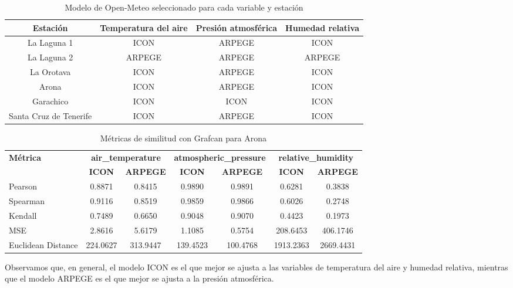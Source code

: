 \begin{table}[htb]
    \centering
    \begin{tabular}{|c|c|c|c|}
        \hline
        Estación & Temperatura del aire & Presión atmosférica & Humedad relativa \\
        \hline
        La Laguna 1 & ICON & ARPEGE & ICON \\
        La Laguna 2 & ARPEGE & ARPEGE & ARPEGE \\
        La Orotava & ICON & ARPEGE & ICON \\
        Arona & ICON & ARPEGE & ICON \\
        Garachico & ICON & ICON & ICON \\
        Santa Cruz de Tenerife & ICON & ARPEGE & ICON \\
        \hline
    \end{tabular}
    \caption{Modelo de Open-Meteo seleccionado para cada variable y estación}
    \label{tabla_modelos_seleccionados}
\end{table}

\begin{table}[h!]
\centering
\caption{Métricas de similitud con Grafcan para Arona}
\label{tab:sim_metrics}
\footnotesize {
\begin{tabular}{l  cc  cc  cc}
\toprule
\textbf{Métrica} &
\multicolumn{2}{c}{\textbf{air\_temperature}} &
\multicolumn{2}{c}{\textbf{atmospheric\_pressure}} &
\multicolumn{2}{c}{\textbf{relative\_humidity}} \\
\cmidrule(lr){2-3} \cmidrule(lr){4-5} \cmidrule(lr){6-7}
 & \textbf{ICON} & \textbf{ARPEGE} & \textbf{ICON} & \textbf{ARPEGE} & \textbf{ICON} & \textbf{ARPEGE} \\
\midrule
Pearson               & 0.8871 & 0.8415 & 0.9890 & 0.9891 & 0.6281 & 0.3838 \\
Spearman              & 0.9116 & 0.8519 & 0.9859 & 0.9866 & 0.6026 & 0.2748 \\
Kendall               & 0.7489 & 0.6650 & 0.9048 & 0.9070 & 0.4423 & 0.1973 \\
MSE                   & 2.8616 & 5.6179 & 1.1085 & 0.5754 & 208.6453 & 406.1746 \\
Euclidean Distance    & 224.0627 & 313.9447 & 139.4523 & 100.4768 & 1913.2363 & 2669.4431 \\
\bottomrule
\end{tabular}
}
\end{table}


Observamos que, en general, el modelo ICON es el que mejor se ajusta a las variables de temperatura del aire y humedad relativa,
 mientras que el modelo ARPEGE es el que mejor se ajusta a la presión atmosférica.

